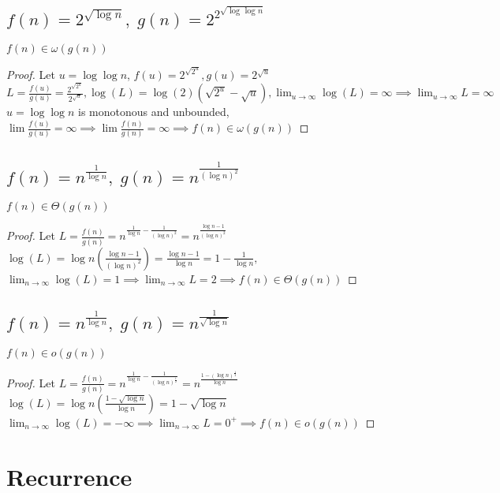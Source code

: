 \documentclass{article}
\begin{document}
\subsection{$f(n) = 2^{\sqrt{\log n}},\; g(n) = 2^{2^{\sqrt{\log\log n}}}$}
$f(n) \in \omega(g(n))$
\begin{proof}
Let $u = \log\log n$, $f(u) = 2^{\sqrt{2^u}}, g(u) = 2^{\sqrt{u}}$\\
$L = \frac{f(u)}{g(u)} = \frac{2^{\sqrt{2^u}}}{2^{\sqrt{u}}}, \log(L) = \log(2) (\sqrt{2^u} - \sqrt{u}), \lim_{u \rightarrow \infty}\log(L) = \infty \implies
\lim_{u \rightarrow \infty}L = \infty$\\
$u = \log\log n $ is monotonous and unbounded, $\lim \frac{f(u)}{g(u)} = \infty \implies \lim \frac{f(n)}{g(n)} = \infty \implies f(n) \in \omega(g(n)) $
\end{proof}


\subsection{$f(n) = n^{\frac{1}{\log n}},\; g(n) = n^{\frac{1}{(\log n)^2}}$}
$f(n) \in \Theta(g(n))$
\begin{proof}
    Let $L = \frac{f(n)}{g(n)} = n^{\frac{1}{\log n} - \frac{1}{(\log n)^2}} = n^{\frac{\log n - 1}{(\log n)^2}}$\\
    $\log(L) = \log n (\frac{\log n - 1}{(\log n)^2}) = \frac{\log n - 1}{\log n} = 1 - \frac{1}{\log n}, $\\
    $\lim_{n \rightarrow \infty} \log(L) = 1 \implies \lim_{n \rightarrow \infty} L = 2 \implies f(n) \in \Theta(g(n))$
\end{proof}

\subsection{$f(n) = n^{\frac{1}{\log n}},\; g(n) = n^{\frac{1}{\sqrt{\log n}}}$}
$f(n) \in o(g(n))$
\begin{proof}
    Let $L = \frac{f(n)}{g(n)} = n^{\frac{1}{\log n} - \frac{1}{(\log n)^\frac{1}{2}}} = n^{\frac{1-(\log n)^{\frac{1}{2}}}{\log n}}$\\
    $\log(L) = \log n (\frac{1-\sqrt{\log n}}{\log n}) = 1-\sqrt{\log n} $\\
    $\lim_{n \rightarrow \infty} \log(L) = -\infty \implies \lim_{n \rightarrow \infty} L = 0^+ \implies f(n) \in o(g(n))$
\end{proof}

\section{Recurrence}
\end{document}
